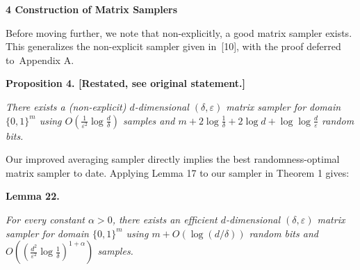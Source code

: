 





\par\medskip\noindent\textbf{
4 Construction of Matrix Samplers}\par




Before moving further, we note that non-explicitly,
a good matrix sampler exists.
This generalizes the non-explicit sampler given in [10], with the proof deferred to Appendix A.\par






\par\medskip\noindent\textbf{
\textbf{Proposition 4}\textbf{.}
[Restated, see original statement.]}\par



\emph{There exists a (non-explicit) $d$-dimensional $(\delta,\varepsilon)$ matrix sampler for domain $\{0,1\}^{m}$ using $O(\frac{1}{\varepsilon^{2}}\log\frac{d}{\delta})$ samples and $m+2\log\frac{1}{\delta}+2\log d+\log\log\frac{d}{\varepsilon}$ random bits.}\par







Our improved averaging sampler directly implies the best randomness-optimal matrix sampler to date.
Applying Lemma 17 to our sampler in Theorem 1 gives:\par





\par\medskip\noindent\textbf{
\textbf{Lemma 22}\textbf{.}
}\par



\emph{For every constant $\alpha>0$, there exists an efficient $d$-dimensional $(\delta,\varepsilon)$ matrix sampler for domain $\{0,1\}^{m}$ using $m+O(\log(d/\delta))$ random bits and $O((\frac{d^{2}}{\varepsilon^{2}}\log\frac{1}{\delta})^{1+\alpha})$ samples.}\par






